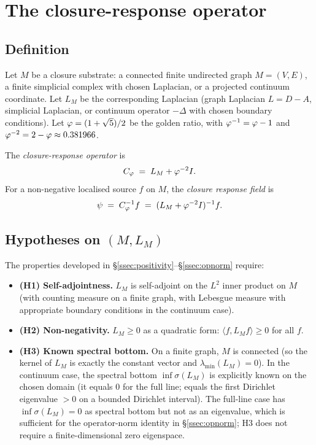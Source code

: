 \section{The closure-response operator}\label{sec:definition}

\subsection{Definition}

Let $M$ be a closure substrate: a connected finite undirected graph
$M=(V,E)$, a finite simplicial complex with chosen Laplacian, or a
projected continuum coordinate. Let $L_M$ be the corresponding
Laplacian (graph Laplacian $L = D - A$, simplicial Laplacian, or
continuum operator $-\Delta$ with chosen boundary conditions).
Let $\varphi = (1+\sqrt{5})/2$ be the golden ratio, with $\varphi^{-1} = \varphi - 1$
and $\varphi^{-2} = 2 - \varphi \approx 0.381966$.

The \emph{closure-response operator} is
\begin{equation}\label{eq:cphi}
C_{\varphi} \;=\; L_M + \varphi^{-2} I.
\end{equation}
For a non-negative localised source $f$ on $M$, the
\emph{closure response field} is
\begin{equation}\label{eq:psi}
\psi \;=\; C_{\varphi}^{-1} f \;=\; (L_M + \varphi^{-2} I)^{-1} f.
\end{equation}

\subsection{Hypotheses on $(M, L_M)$}\label{ssec:hypotheses}

The properties developed in \S\ref{ssec:positivity}--\S\ref{ssec:opnorm}
require:

\begin{itemize}\itemsep=2pt
\item \textbf{(H1) Self-adjointness.} $L_M$ is self-adjoint on the
  $L^{2}$ inner product on $M$ (with counting measure on a finite
  graph, with Lebesgue measure with appropriate boundary conditions
  in the continuum case).
\item \textbf{(H2) Non-negativity.} $L_M \geq 0$ as a
  quadratic form: $\langle f, L_M f\rangle \geq 0$ for all $f$.
\item \textbf{(H3) Known spectral bottom.} On a finite graph, $M$
  is connected (so the kernel of $L_M$ is exactly the constant
  vector and $\lambda_{\min}(L_M) = 0$). In the continuum case,
  the spectral bottom $\inf \sigma(L_M)$ is explicitly known on
  the chosen domain (it equals $0$ for the full line; equals the
  first Dirichlet eigenvalue $> 0$ on a bounded Dirichlet
  interval). The full-line case has $\inf \sigma(L_M) = 0$ as
  spectral bottom but not as an eigenvalue, which is sufficient
  for the operator-norm identity in
  \S\ref{ssec:opnorm}; H3 does not require a finite-dimensional
  zero eigenspace.
\end{itemize}

